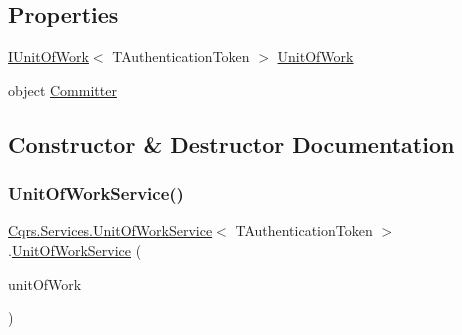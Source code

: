 \subsection*{Properties}
\begin{DoxyCompactItemize}
\item 
\hyperlink{interfaceCqrs_1_1Domain_1_1IUnitOfWork}{I\+Unit\+Of\+Work}$<$ T\+Authentication\+Token $>$ \hyperlink{classCqrs_1_1Services_1_1UnitOfWorkService_a1ba76512e37e5006c2b65d071803e99f_a1ba76512e37e5006c2b65d071803e99f}{Unit\+Of\+Work}
\item 
object \hyperlink{classCqrs_1_1Services_1_1UnitOfWorkService_aabeccb6ba949fe02b8676b324f85950b_aabeccb6ba949fe02b8676b324f85950b}{Committer}
\end{DoxyCompactItemize}


\subsection{Constructor \& Destructor Documentation}
\mbox{\label{classCqrs_1_1Services_1_1UnitOfWorkService_a187b3f612490a8316770bb7c6a9aa25f_a187b3f612490a8316770bb7c6a9aa25f}} 
\subsubsection{\texorpdfstring{Unit\+Of\+Work\+Service()}{UnitOfWorkService()}}
{\footnotesize\ttfamily \hyperlink{classCqrs_1_1Services_1_1UnitOfWorkService}{Cqrs.\+Services.\+Unit\+Of\+Work\+Service}$<$ T\+Authentication\+Token $>$.\hyperlink{classCqrs_1_1Services_1_1UnitOfWorkService}{Unit\+Of\+Work\+Service} (\begin{DoxyParamCaption}\item[{\hyperlink{interfaceCqrs_1_1Domain_1_1IUnitOfWork}{I\+Unit\+Of\+Work}$<$ T\+Authentication\+Token $>$}]{unit\+Of\+Work }\end{DoxyParamCaption})}



